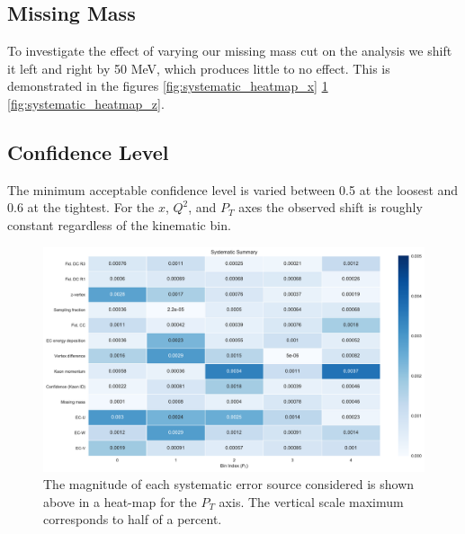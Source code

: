 \subsection{Missing Mass}
To investigate the effect of varying our missing mass cut on the analysis we shift it left and right by 50 MeV, which produces little to no effect.  This is demonstrated in the figures \ref{fig:systematic_heatmap_x} \ref{fig:systematic_heatmap_pt} \ref{fig:systematic_heatmap_z}.  

\subsection{Confidence Level}
The minimum acceptable confidence level is varied between 0.5 at the loosest and 0.6 at the tightest.  For the $x$, $Q^2$, and $P_T$ axes the observed shift is roughly constant regardless of the kinematic bin.  

\begin{figure}
	\label{fig:systematic_heatmap_pt}
	\begin{center}
		\includegraphics[width=\textwidth]{image/plots/kaon-bsa/systematics_integrated_heatmap_pt.pdf}
		\caption{The magnitude of each systematic error source considered is shown above in a heat-map for the $P_T$ axis.  The vertical scale maximum corresponds to half of a percent.}
	\end{center}
\end{figure}

